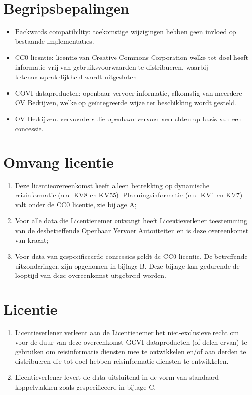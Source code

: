 \documentclass[10pt, a4paper]{article}
\begin{document}
\newpage

\section{Begripsbepalingen}
\begin{itemize}
\item Backwards compatibility: toekomstige wijzigingen hebben geen invloed op bestaande implementaties.
\item CC0 licentie: licentie van Creative Commons Corporation welke tot doel heeft informatie vrij van gebruiksvoorwaarden te distribueren, waarbij ketenaansprakelijkheid wordt uitgesloten.
\item GOVI dataproducten: openbaar vervoer informatie, afkomstig van meerdere OV Bedrijven, welke op geïntegreerde wijze ter beschikking wordt gesteld.
\item OV Bedrijven: vervoerders die openbaar vervoer verrichten op basis van een concessie.
\end{itemize}

\section{Omvang licentie}
\begin{enumerate}
\item Deze licentieovereenkomst heeft alleen betrekking op dynamische reisinformatie (o.a. KV8 en KV55). Planningsinformatie (o.a. KV1 en KV7) valt onder de CC0 licentie, zie bijlage A;
\item Voor alle data die Licentienemer ontvangt heeft Licentieverlener toestemming van de desbetreffende Openbaar Vervoer Autoriteiten en is deze overeenkomst van kracht;
\item Voor data van gespecificeerde concessies geldt de CC0 licentie. De betreffende uitzonderingen zijn opgenomen in bijlage B. Deze bijlage kan gedurende de looptijd van deze overeenkomst uitgebreid worden.
\end{enumerate}

\section{Licentie}
\begin{enumerate}
\item Licentieverlener verleent aan de Licentienemer het niet-exclusieve recht om voor de duur van deze overeenkomst GOVI dataproducten (of delen ervan) te gebruiken om reisinformatie diensten mee te ontwikkelen en/of aan derden te distribueren die tot doel hebben reisinformatie diensten te ontwikkelen.
\item Licentieverlener levert de data uitsluitend in de vorm van standaard koppelvlakken zoals gespecificeerd in bijlage C.
\end{enumerate}
\end{document}
